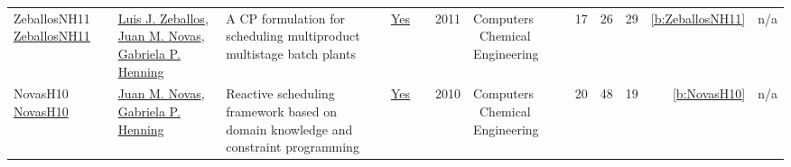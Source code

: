 {\begin{longtable}{>{\raggedright\arraybackslash}p{3cm}>{\raggedright\arraybackslash}p{6cm}>{\raggedright\arraybackslash}p{6.5cm}rrrp{2.5cm}rrrrr}
ZeballosNH11 \href{http://dx.doi.org/10.1016/j.compchemeng.2011.01.043}{ZeballosNH11} & \hyperref[auth:a1173]{Luis J. Zeballos}, \hyperref[auth:a527]{Juan M. Novas}, \hyperref[auth:a594]{Gabriela P. Henning} & A CP formulation for scheduling multiproduct multistage batch plants & \href{../works/ZeballosNH11.pdf}{Yes} & \cite{ZeballosNH11} & 2011 & Computers \  Chemical Engineering & 17 & 26 & 29 & \ref{b:ZeballosNH11} & n/a\\
NovasH10 \href{https://doi.org/10.1016/j.compchemeng.2010.07.011}{NovasH10} & \hyperref[auth:a527]{Juan M. Novas}, \hyperref[auth:a594]{Gabriela P. Henning} & Reactive scheduling framework based on domain knowledge and constraint programming & \href{../works/NovasH10.pdf}{Yes} & \cite{NovasH10} & 2010 & Computers \  Chemical Engineering & 20 & 48 & 19 & \ref{b:NovasH10} & n/a\\
\end{longtable}
}

\clearpage
